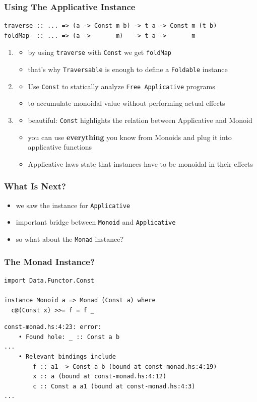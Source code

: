 \documentclass[aspectratio=169]{beamer}
\begin{document}
\begin{frame}[fragile]
  \frametitle{Using The Applicative Instance}
  \begin{verbatim}
traverse :: ... => (a -> Const m b) -> t a -> Const m (t b)
foldMap  :: ... => (a ->       m)   -> t a ->       m
  \end{verbatim}
  \begin{enumerate}
  \item
    \begin{itemize}
    \item by using \texttt{traverse} with \texttt{Const} we get \texttt{foldMap}
    \item that's why \texttt{Traversable} is enough to define a \texttt{Foldable} instance
    \end{itemize}
  \item
    \begin{itemize}
    \item Use \texttt{Const} to statically analyze \texttt{Free Applicative} programs
    \item to accumulate monoidal value without performing actual effects
    \end{itemize}
  \item
    \begin{itemize}
    \item beautiful: \texttt{Const} highlights the relation between
      Applicative and Monoid
    \item you can use \textbf{everything} you know from Monoids and plug it into applicative functions
    \item Applicative laws state that instances have to be monoidal in their effects
    \end{itemize}
  \end{enumerate}
\end{frame}

\begin{frame}[fragile]
  \frametitle{What Is Next?}
  \begin{itemize}
  \item we saw the instance for \texttt{Applicative}
  \item important bridge between \texttt{Monoid} and \texttt{Applicative}
  \item so what about the \texttt{Monad} instance?
  \end{itemize}
\end{frame}

\begin{frame}[fragile]
  \frametitle{The Monad Instance?}
  \begin{verbatim}
import Data.Functor.Const

instance Monoid a => Monad (Const a) where
  c@(Const x) >>= f = f _
  \end{verbatim}
  \begin{verbatim}
const-monad.hs:4:23: error:
    • Found hole: _ :: Const a b
...
    • Relevant bindings include
        f :: a1 -> Const a b (bound at const-monad.hs:4:19)
        x :: a (bound at const-monad.hs:4:12)
        c :: Const a a1 (bound at const-monad.hs:4:3)
...
  \end{verbatim}
\end{frame}
\end{document}
